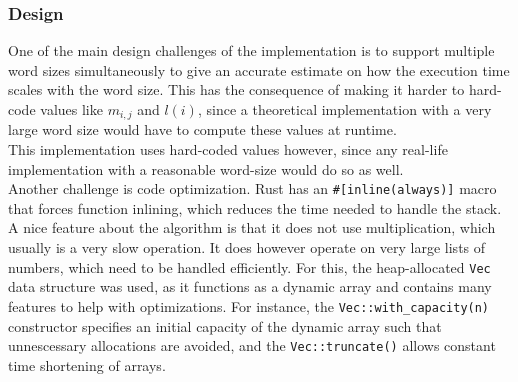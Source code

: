 \subsubsection{Design}
One of the main design challenges of the implementation is to support multiple word sizes simultaneously to give an accurate estimate on how the execution time scales with the word size. This has the consequence of making it harder to hard-code values like $m_{i, j}$ and $l(i)$, since a theoretical implementation with a very large word size would have to compute these values at runtime.\\
This implementation uses hard-coded values however, since any real-life implementation with a reasonable word-size would do so as well.\\
Another challenge is code optimization. Rust has an \texttt{\#[inline(always)]} macro that forces function inlining, which reduces the time needed to handle the stack.
A nice feature about the algorithm is that it does not use multiplication, which usually is a very slow operation. It does however operate on very large lists of numbers, which need to be handled efficiently. For this, the heap-allocated \texttt{Vec} data structure was used, as it functions as a dynamic array and contains many features to help with optimizations. For instance, the \texttt{Vec::with\_capacity(n)} constructor specifies an initial capacity of the dynamic array such that unnescessary allocations are avoided, and the \texttt{Vec::truncate()} allows constant time shortening of arrays\cite{rust-lang}.\\


